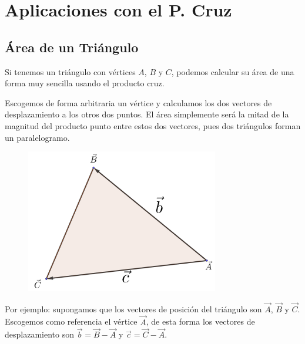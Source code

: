 \documentclass[12pt, fleqn]{report}                             %
\theoremstyle{break}                                            %
\begin{document}
        \section{Aplicaciones con el P. Cruz}

            \subsection{Área de un Triángulo}
            
                Si tenemos un triángulo con vértices $A$, $B$ y $C$, podemos calcular su área de una forma muy
                sencilla usando el producto cruz.
                
                Escogemos de forma arbitraria un vértice y calculamos los dos vectores de desplazamiento a los
                otros dos puntos. El área simplemente será la mitad de la magnitud del producto punto entre
                estos dos vectores, pues dos triángulos forman un paralelogramo.

                \begin{figure}[H]
                    \centering
                    \includegraphics[width=0.75\textwidth]{triangle}
                \end{figure}
                
                Por ejemplo: supongamos que los vectores de posición del triángulo son $\vec{A}$, $\vec{B}$ y $\vec{C}$.
                Escogemos como referencia el vértice $\vec{A}$, de esta forma los vectores de desplazamiento son
                $\vec{b} = \vec{B}-\vec{A}$ y $\vec{c} = \vec{C}-\vec{A}$.
\end{document}
